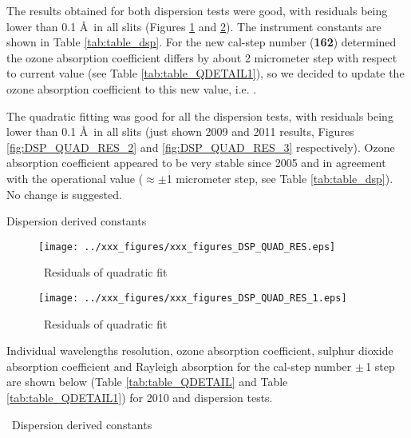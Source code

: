 The results obtained for both dispersion tests were good, with residuals being lower than 0.1 \AA\ in all slits (Figures \ref{fig:DSP_QUAD_RES} and \ref{fig:DSP_QUAD_RES_1}). The instrument constants are shown in Table \ref{tab:table_dsp}. For the new cal-step number (\textbf{162}) determined the ozone absorption coefficient differs by about 2 micrometer step with respect to current value (see Table \ref{tab:table_QDETAIL1}), so we decided to update the ozone absorption coefficient to this new value, i.e. \textbf{\Adef}.

The quadratic fitting was good for all the dispersion tests, with residuals being lower than 0.1 \AA\ in all slits (just shown 2009 and 2011 results, Figures \ref{fig:DSP_QUAD_RES_2} and \ref{fig:DSP_QUAD_RES_3} respectively). Ozone absorption coefficient appeared to be very stable since 2005 and in agreement with the operational value ($\approx\pm$1 micrometer step, see Table \ref{tab:table_dsp}). No change is suggested.

\begin{table}[htbp!] \centering
		\caption{Dispersion derived constants}
		\label{tab:table_dsp}
			
\end{table}

\begin{figure}[htbp!]
\begin{center}
		\texttt{[image: ../xxx\_figures/xxx\_figures\_DSP\_QUAD\_RES.eps]}
		\caption{\calyearold\ Residuals of quadratic fit}
		\label{fig:DSP_QUAD_RES}
\end{center}
\end{figure}

\begin{figure}[htbp!]
\begin{center}
		\texttt{[image: ../xxx\_figures/xxx\_figures\_DSP\_QUAD\_RES\_1.eps]}
		\caption{\calyear\ Residuals of quadratic fit}
		\label{fig:DSP_QUAD_RES_1}
\end{center}
\end{figure}

\clearpage
Individual wavelengths resolution, ozone absorption coefficient, sulphur dioxide absorption coefficient and 
Rayleigh absorption for the cal-step number $\pm$\,1 step are shown below (Table \ref{tab:table_QDETAIL} and Table \ref{tab:table_QDETAIL1}) for 2010 and \calyear dispersion tests.
\vspace{1cm}
\begin{table}[htbp!] \centering
		\caption{\calyearold\ Dispersion derived constants}
		\label{tab:table_QDETAIL}
		
\end{table}

